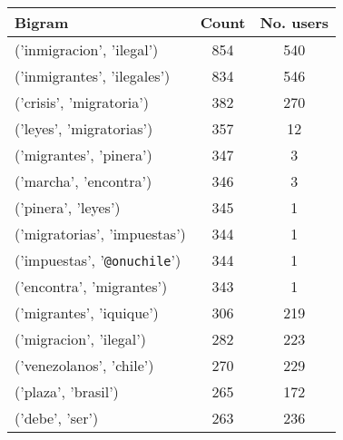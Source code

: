 %
    
    \begin{tabular}{lcc}
        \toprule\toprule
        Bigram & Count & No. users\\ \midrule
        ('inmigracion', 'ilegal') & 854 & 540 \\ 
        ('inmigrantes', 'ilegales') & 834 & 546 \\ 
        ('crisis', 'migratoria') &  382 & 270 \\ 
        ('leyes', 'migratorias') &  357 & 12 \\
        ('migrantes', 'pinera') & 347 & 3 \\ 
        ('marcha', 'encontra') & 346 & 3 \\ 
        ('pinera', 'leyes') & 345 & 1 \\ 
        ('migratorias', 'impuestas') & 344 & 1 \\
        ('impuestas', '\texttt{@onuchile}') & 344 & 1 \\ 
        ('encontra', 'migrantes') & 343 & 1 \\
        ('migrantes', 'iquique') & 306 & 219 \\ 
        ('migracion', 'ilegal') & 282 & 223 \\ 
        ('venezolanos', 'chile') & 270 & 229 \\
        ('plaza', 'brasil') & 265 & 172 \\
        ('debe', 'ser') & 263 & 236 \\
        \bottomrule\bottomrule
    \end{tabular}

%